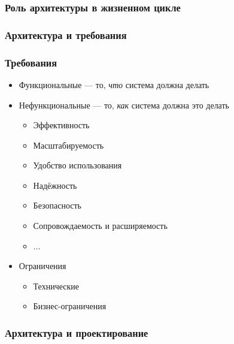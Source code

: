 \documentclass{../mcsslides}
\begin{document}
    \begin{frame}
        \frametitle{Роль архитектуры в жизненном цикле}
    \end{frame}

    \begin{frame}
        \frametitle{Архитектура и требования}
    \end{frame}

    \begin{frame}
        \frametitle{Требования}
        \begin{itemize}
            \item Функциональные --- то, \emph{что} система должна делать
            \item Нефункциональные --- то, \emph{как} система должна это делать
            \begin{itemize}
                \item Эффективность
                \item Масштабируемость
                \item Удобство использования
                \item Надёжность
                \item Безопасность
                \item Сопровождаемость и расширяемость
                \item ...
            \end{itemize}
            \item Ограничения
            \begin{itemize}
                \item Технические
                \item Бизнес-ограничения
            \end{itemize}
        \end{itemize}
    \end{frame}

    \begin{frame}
        \frametitle{Архитектура и проектирование}
    \end{frame}
\end{document}
